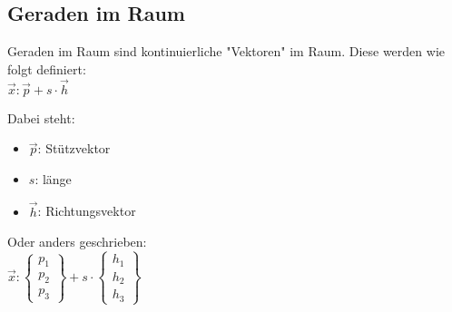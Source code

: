 \subsection{Geraden im Raum}
Geraden im Raum sind kontinuierliche "Vektoren" im Raum. 
Diese werden wie folgt definiert: \\
$
\vec{x}: \vec{p} + s\cdot \vec{h} 
$
\par
Dabei steht:
\begin{itemize}
    \item $\vec{p}$: Stützvektor
    \item $s$: länge
    \item $\vec{h}$: Richtungsvektor
\end{itemize}
Oder anders geschrieben: \\
$
\vec{x}: 
\begin{Bmatrix}
    p_1 \\ p_2 \\ p_3
\end{Bmatrix}
+ s \cdot
\begin{Bmatrix}
    h_1 \\ h_2 \\ h_3
\end{Bmatrix}
$

